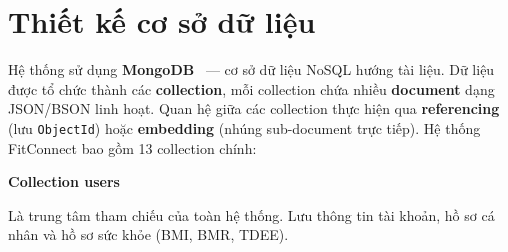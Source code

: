 \section{Thiết kế cơ sở dữ liệu}
\label{sec:database_design}

Hệ thống sử dụng \textbf{MongoDB}~\cite{MongoDBDocs} --- cơ sở dữ liệu NoSQL hướng tài liệu. Dữ liệu được tổ chức thành các \textbf{collection}, mỗi collection chứa nhiều \textbf{document} dạng JSON/BSON linh hoạt. Quan hệ giữa các collection thực hiện qua \textbf{referencing} (lưu \texttt{ObjectId}) hoặc \textbf{embedding} (nhúng sub-document trực tiếp). Hệ thống FitConnect bao gồm 13 collection chính:

\textbf{Collection users}
\label{subsec:col_users}

Là trung tâm tham chiếu của toàn hệ thống. Lưu thông tin tài khoản, hồ sơ cá nhân và hồ sơ sức khỏe (BMI, BMR, TDEE).


